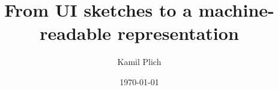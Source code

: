 \documentclass[11pt]{article}
\begin{document}
    \title{From UI sketches to a machine-readable representation}
    \author{Kamil Plich}
    \date{\today}
    \maketitle

    \begin{abstract}
        
    \end{abstract}

    
    

    
    
\end{document}
